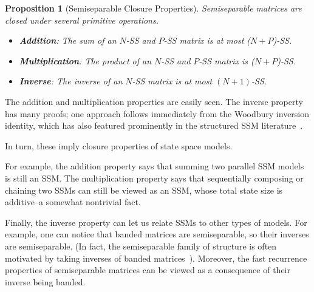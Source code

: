 \documentclass{article}
\newcommand{\citep}{\parencite}
\newtheorem{proposition}[theorem]{Proposition}
\begin{document}
\begin{proposition}[Semiseparable Closure Properties]
  \label{prop:ss-closure}
  Semiseparable matrices are closed under several primitive operations.
  \begin{itemize}
    \item \textbf{Addition}: The sum of an $N$-SS and $P$-SS matrix is at most ($N+P$)-SS.
    \item \textbf{Multiplication}: The product of an $N$-SS and $P$-SS matrix is ($N+P$)-SS.
    \item \textbf{Inverse}: The inverse of an $N$-SS matrix is at most $(N+1)$-SS.
  \end{itemize}
\end{proposition}
The addition and multiplication properties are easily seen.
The inverse property has many proofs; one approach follows immediately from the Woodbury inversion identity, which has also featured prominently in the structured SSM literature~\citep{gu2022efficiently}.

In turn, these imply closure properties of state space models.

For example, the addition property says that summing two parallel SSM models is still an SSM.
The multiplication property says that sequentially composing or chaining two SSMs can still be viewed as an SSM, whose total state size is additive--a somewhat nontrivial fact.

Finally, the inverse property can let us relate SSMs to other types of models. For example,
one can notice that banded matrices are semiseparable, so their inverses are semiseparable.
(In fact, the semiseparable family of structure is often motivated by taking inverses of banded matrices~\citep{vandebril2005bibliography}).
Moreover, the fast recurrence properties of semiseparable matrices can be viewed as a consequence of their inverse being banded.
\end{document}
